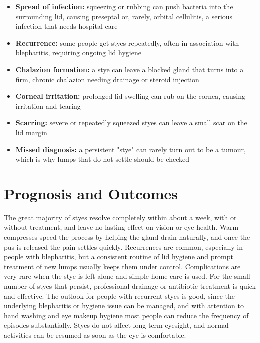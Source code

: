 \begin{itemize}
    \item \textbf{Spread of infection:} squeezing or rubbing can push bacteria into the surrounding lid, causing preseptal or, rarely, orbital cellulitis, a serious infection that needs hospital care
    \item \textbf{Recurrence:} some people get styes repeatedly, often in association with blepharitis, requiring ongoing lid hygiene
    \item \textbf{Chalazion formation:} a stye can leave a blocked gland that turns into a firm, chronic chalazion needing drainage or steroid injection
    \item \textbf{Corneal irritation:} prolonged lid swelling can rub on the cornea, causing irritation and tearing
    \item \textbf{Scarring:} severe or repeatedly squeezed styes can leave a small scar on the lid margin
    \item \textbf{Missed diagnosis:} a persistent "stye" can rarely turn out to be a tumour, which is why lumps that do not settle should be checked
\end{itemize}

\section*{Prognosis and Outcomes}
The great majority of styes resolve completely within about a week, with or without treatment, and leave no lasting effect on vision or eye health. Warm compresses speed the process by helping the gland drain naturally, and once the pus is released the pain settles quickly. Recurrences are common, especially in people with blepharitis, but a consistent routine of lid hygiene and prompt treatment of new lumps usually keeps them under control. Complications are very rare when the stye is left alone and simple home care is used. For the small number of styes that persist, professional drainage or antibiotic treatment is quick and effective. The outlook for people with recurrent styes is good, since the underlying blepharitis or hygiene issue can be managed, and with attention to hand washing and eye makeup hygiene most people can reduce the frequency of episodes substantially. Styes do not affect long-term eyesight, and normal activities can be resumed as soon as the eye is comfortable.

